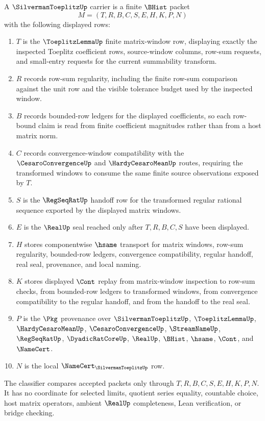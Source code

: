 \begin{definition}\label{def:silverman-toeplitz-carrier}
A $\SilvermanToeplitzUp$ carrier is a finite $\BHist$ packet
$$
M=(T,R,B,C,S,E,H,K,P,N)
$$
with the following displayed rows:
\begin{enumerate}
\item $T$ is the $\ToeplitzLemmaUp$ finite matrix-window row, displaying exactly the inspected Toeplitz coefficient rows, source-window columns, row-sum requests, and small-entry requests for the current summability transform.
\item $R$ records row-sum regularity, including the finite row-sum comparison against the unit row and the visible tolerance budget used by the inspected window.
\item $B$ records bounded-row ledgers for the displayed coefficients, so each row-bound claim is read from finite coefficient magnitudes rather than from a host matrix norm.
\item $C$ records convergence-window compatibility with the $\CesaroConvergenceUp$ and $\HardyCesaroMeanUp$ routes, requiring the transformed windows to consume the same finite source observations exposed by $T$.
\item $S$ is the $\RegSeqRatUp$ handoff row for the transformed regular rational sequence exported by the displayed matrix windows.
\item $E$ is the $\RealUp$ seal reached only after $T,R,B,C,S$ have been displayed.
\item $H$ stores componentwise $\hsame$ transport for matrix windows, row-sum regularity, bounded-row ledgers, convergence compatibility, regular handoff, real seal, provenance, and local naming.
\item $K$ stores displayed $\Cont$ replay from matrix-window inspection to row-sum checks, from bounded-row ledgers to transformed windows, from convergence compatibility to the regular handoff, and from the handoff to the real seal.
\item $P$ is the $\Pkg$ provenance over $\SilvermanToeplitzUp$, $\ToeplitzLemmaUp$, $\HardyCesaroMeanUp$, $\CesaroConvergenceUp$, $\StreamNameUp$, $\RegSeqRatUp$, $\DyadicRatCoreUp$, $\RealUp$, $\BHist$, $\hsame$, $\Cont$, and $\NameCert$.
\item $N$ is the local $\NameCert_{\SilvermanToeplitzUp}$ row.
\end{enumerate}
The classifier compares accepted packets only through $T,R,B,C,S,E,H,K,P,N$. It has no coordinate for selected limits, quotient series equality, countable choice, host matrix operators, ambient $\RealUp$ completeness, Lean verification, or bridge checking.
\end{definition}

